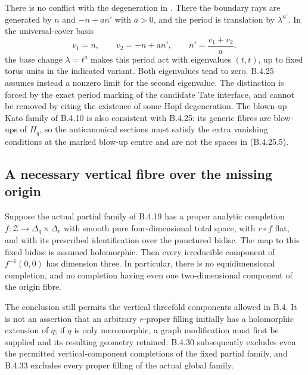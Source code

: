 \begin{remark}
There is no conflict with the degeneration in
\citet[Section 13, pp.~116--118]{Oda1978D}.
There the boundary rays are generated by $n$ and
$-n+a n'$ with $a>0$, and the period is translation
by $\lambda^{n'}$. In the universal-cover basis
\[
 v_1=n,\qquad v_2=-n+a n',\qquad
 n'=\frac{v_1+v_2}{a},
\]
the base change $\lambda=t^a$ makes this period
act with eigenvalues $(t,t)$, up to fixed torus
units in the indicated variant. Both eigenvalues
tend to zero. B.4.25 assumes instead a nonzero
limit for the second eigenvalue. The distinction
is forced by the exact period marking of the
candidate Tate interface, and cannot be removed
by citing the existence of some Hopf degeneration.
The blown-up Kato family of B.4.10 is also consistent
with B.4.25: its generic fibres are blow-ups of
$H_q$, so the anticanonical sections must satisfy
the extra vanishing conditions at the marked
blow-up centre and are not the spaces in
(B.4.25.5).
\end{remark}

\subsection{A necessary vertical fibre over the missing origin}

\begin{proposition}\label{push:src:B.4.26}
\label{push:B426}
Suppose the actual partial family of B.4.19 has a
proper analytic completion $f:\mathcal Z\to\Delta_q\times\Delta_r$
with smooth pure four-dimensional total space, with
$r\circ f$ flat, and with its prescribed identification
over the punctured bidisc. The map to this fixed bidisc
is assumed holomorphic. Then every irreducible component
of $f^{-1}(0,0)$ has dimension three. In particular,
there is no equidimensional completion, and no completion
having even one two-dimensional component of the origin
fibre.

The conclusion still permits the vertical threefold
components allowed in B.4. It is not an assertion that
an arbitrary $r$-proper filling initially has a holomorphic
extension of $q$; if $q$ is only meromorphic, a graph
modification must first be supplied and its resulting
geometry retained. B.4.30 subsequently excludes even
the permitted vertical-component completions of the
fixed partial family, and B.4.33 excludes every proper
filling of the actual global family.
\end{proposition}

